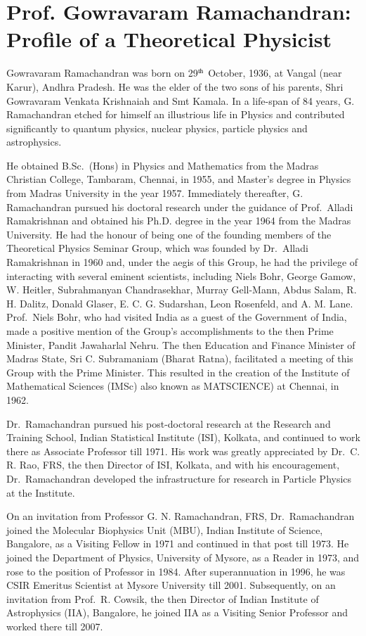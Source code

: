 \chapter[Profile of a Theoretical Physicist]{Prof. Gowravaram Ramachandran: Profile of a Theoretical Physicist}\label{chap37}

Gowravaram Ramachandran was born on 29$^{\rm th}$ October, 1936, at Vangal (near Karur), Andhra Pradesh. He was the elder of the two sons of his parents, Shri Gowravaram Venkata Krishnaiah and Smt Kamala. In a life-span of 84 years, G. Ramachandran etched for himself an illustrious life in Physics and contributed significantly to quantum physics, nuclear physics, particle physics and astrophysics.
 
He obtained B.Sc.\ (Hons) in Physics and Mathematics from the Madras Christian College, Tambaram, Chennai, in 1955, and Master's degree in Physics from Madras University in the year 1957. Immediately thereafter, G. Ramachandran pursued his doctoral research under the guidance of Prof.\ Alladi Ramakrishnan and obtained his Ph.D. degree in the year 1964 from the Madras University. He had the honour of being one of the founding members of the Theoretical Physics Seminar Group, which was founded by Dr.\ Alladi Ramakrishnan in 1960 and, under the aegis of this Group, he had the privilege of interacting with several eminent scientists, including Niels Bohr, George Gamow, W. Heitler,  Subrahmanyan Chandrasekhar, Murray Gell-Mann, Abdus Salam, R. H. Dalitz, Donald Glaser, E. C. G. Sudarshan, Leon Rosenfeld, and A. M. Lane. Prof.\ Niels Bohr, who had visited India as a guest of the Government of India, made a positive mention of the Group's accomplishments to the then Prime Minister, Pandit Jawaharlal Nehru. The then Education and Finance Minister of Madras State, Sri C. Subramaniam (Bharat Ratna), facilitated a meeting of this Group with the Prime Minister. This resulted in the creation of the Institute of Mathematical Sciences (IMSc) also known as MATSCIENCE) at Chennai, in 1962.
 
Dr.\ Ramachandran pursued his post-doctoral research at the Research and Training School, Indian Statistical Institute (ISI), Kolkata, and continued to work there as Associate Professor till 1971. His work was greatly appreciated by Dr.\ C. R. Rao, FRS, the then Director of ISI, Kolkata, and with his encouragement, Dr.\ Ramachandran developed the infrastructure for research in Particle Physics at the Institute.
 
On an invitation from Professor G. N. Ramachandran, FRS, Dr.\ Ramachandran joined the Molecular Biophysics Unit (MBU), Indian Institute of Science, Bangalore, as a Visiting Fellow in 1971 and continued in that post till 1973. He joined the Department of Physics, University of Mysore, as a Reader in 1973, and rose to the position of Professor in 1984. After superannuation in 1996, he was CSIR Emeritus Scientist at Mysore University till 2001. Subsequently, on an invitation from Prof.\ R. Cowsik, the then Director of Indian Institute of Astrophysics (IIA), Bangalore, he joined IIA as a Visiting Senior Professor and worked there till 2007.
 
